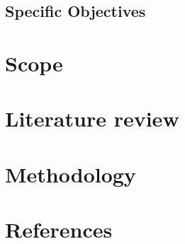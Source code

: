 \documentclass[options]{article}
\begin{document}
\subsection{Specific Objectives}

\section {\textbf{Scope}}

\section{\textbf{Literature review }}


\section {\textbf{Methodology}}

\section{\textbf{References}}
\end{document}
